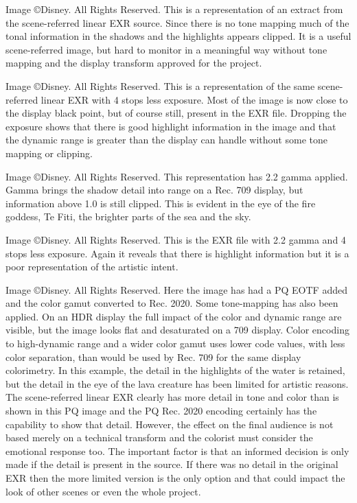 Image ©Disney. All Rights Reserved.
This is a representation of an extract from the scene-referred linear EXR source. Since there is no tone mapping much of the tonal information in the shadows and the highlights appears clipped. It is a useful scene-referred image, but hard to monitor in a meaningful way without tone mapping and the display transform approved for the project.


Image ©Disney. All Rights Reserved.
This is a representation of the same scene-referred linear EXR with 4 stops less exposure. Most of the image is now close to the display black point, but of course still, present in the EXR file. Dropping the exposure shows that there is good highlight information in the image and that the dynamic range is greater than the display can handle without some tone mapping or clipping.


Image ©Disney. All Rights Reserved.
This representation has 2.2 gamma applied. Gamma brings the shadow detail into range on a Rec. 709 display, but information above 1.0 is still clipped. This is evident in the eye of the fire goddess, Te Fiti, the brighter parts of the sea and the sky. 

Image ©Disney. All Rights Reserved.
This is the EXR file with 2.2 gamma and 4 stops less exposure. Again it reveals that there is highlight information but it is a poor representation of the artistic intent. 

Image ©Disney. All Rights Reserved.
Here the image has had a PQ EOTF added and the color gamut converted to Rec. 2020. Some tone-mapping has also been applied. On an HDR display the full impact of the color and dynamic range are visible, but the image looks flat and desaturated on a 709 display. Color encoding to high-dynamic range and a wider color gamut uses lower code values, with less color separation, than would be used by Rec. 709 for the same display colorimetry. In this example, the detail in the highlights of the water is retained, but the detail in the eye of the lava creature has been limited for artistic reasons. The scene-referred linear EXR clearly has more detail in tone and color than is shown in this PQ image and the PQ  Rec. 2020 encoding certainly has the capability to show that detail. However, the effect on the final audience is not based merely on a technical transform and the colorist must consider the emotional response too. The important factor is that an informed decision is only made if the detail is present in the source. If there was no detail in the original EXR then the more limited version is the only option and that could impact the look of other scenes or even the whole project.


